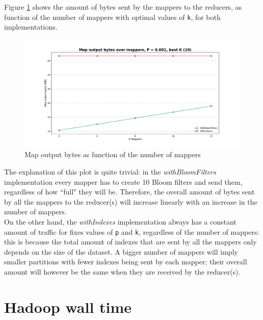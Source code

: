 Figure \ref{fig:MapOutputBytesMappers} shows the amount of bytes sent by the mappers to the reducers, as function of the number of mappers with optimal values of \texttt{k}, for both implementations.\\

\begin{figure}[H]
    \begin{center}
        \includegraphics[scale=.45,trim={3cm 0 3cm 0},clip]{img/MapOutputBytesMappers.pdf}
    \end{center}
    \vspace*{-0.5cm}
    \caption{Map output bytes as function of the number of mappers}
    \label{fig:MapOutputBytesMappers}
\end{figure}

The explanation of this plot is quite trivial: in the \textit{withBloomFilters} implementation every mapper has to create 10 Bloom filters and send them, regardless of how ``full" they will be. Therefore, the overall amount of bytes sent by all the mappers to the reducer(s) will increase linearly with an increase in the number of mappers.\\
On the other hand, the \textit{withIndexes} implementation always has a constant amount of traffic for fixes values of \texttt{p} and \texttt{k}, regardless of the number of mappers: this is because the total amount of indexes that are sent by all the mappers only depends on the size of the dataset. A bigger number of mappers will imply smaller partitions with fewer indexes being sent by each mapper; their overall amount will however be the same when they are received by the reducer(s).

\section{Hadoop wall time}

